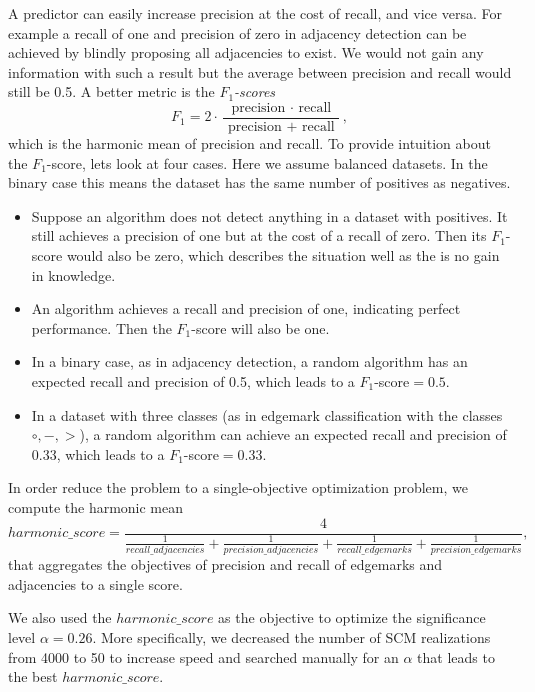 \documentclass[conference]{IEEEtran}
\begin{document}
A predictor can easily increase precision at the cost of recall, and vice versa. For example a recall of one and precision of zero in adjacency detection can be achieved by blindly proposing all adjacencies to exist. We would not gain any information with such a result but the average between precision and recall would still be 0.5. A better metric is the \textit{$F_1$-scores}
\begin{equation}
F_{1}=2 \cdot \frac{\text { precision } \cdot \text { recall }}{\text { precision }+\text { recall }},
\end{equation}
which is the harmonic mean of precision and recall.
To provide intuition about the $F_1$-score, lets look at four cases. Here we assume balanced datasets. In the binary case this means the dataset has the same number of positives as negatives. 
\begin{itemize}
    \item Suppose an algorithm does not detect anything in a dataset with positives. It still achieves a precision of one but at the cost of a recall of zero. Then its $F_1$-score would also be zero, which describes the situation well as the is no gain in knowledge.
    \item An algorithm achieves a recall and precision of one, indicating perfect performance. Then the $F_1$-score will also be one.
    \item In a binary case, as in adjacency detection, a random algorithm has an expected recall and precision of 0.5, which leads to a $F_1$-score$=0.5$.
    \item In a dataset with three classes (as in edgemark classification with the classes $\circ, -, >$), a random algorithm can achieve an expected recall and precision of 0.33, which leads to a $F_1$-score$=0.33$.
\end{itemize}

In order reduce the problem to a single-objective optimization problem, we compute the harmonic mean
\begin{equation}
harmonic\_score=\frac{4}{\frac{1}{recall\_adjacencies}+\frac{1}{precision\_adjacencies}+\frac{1}{recall\_edgemarks}+\frac{1}{precision\_edgemarks}},
\label{eq:harmonicscore}
\end{equation}
that aggregates the objectives of precision and recall of edgemarks and adjacencies to a single score.

We also used the $harmonic\_score$ as the objective to optimize the significance level $\alpha=0.26$. More specifically, we decreased the number of SCM realizations from 4000 to 50 to increase speed and searched manually for an $\alpha$ that leads to the best $harmonic\_score$.
\end{document}
